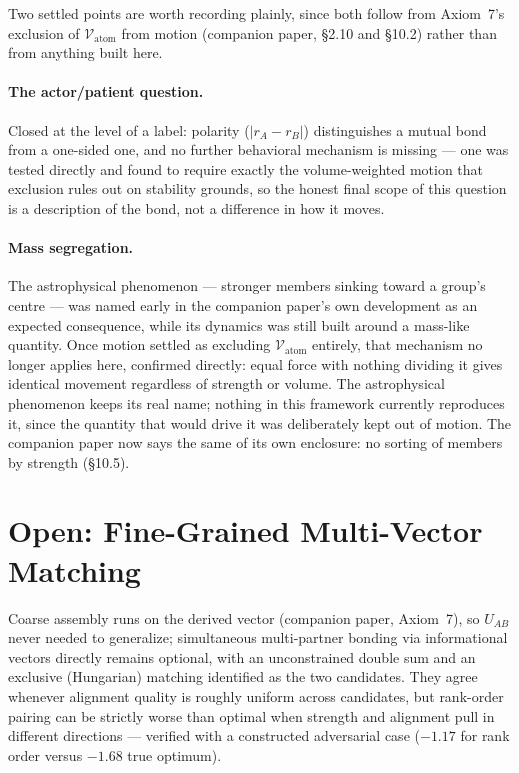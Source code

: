 \documentclass[12pt, a4paper]{article}
\begin{document}
Two settled points are worth recording plainly, since both follow
from Axiom~7's exclusion of $\mathcal{V}_{\text{atom}}$ from motion (companion paper, \S2.10 and \S10.2) rather than from anything built
here.

\paragraph{The actor/patient question.} Closed at the level of a
label: polarity ($\lvert r_A-r_B\rvert$) distinguishes a mutual bond
from a one-sided one, and no further behavioral mechanism is
missing --- one was tested directly and found to require exactly
the volume-weighted motion that exclusion rules out on stability
grounds, so the honest final scope of this question is a
description of the bond, not a difference in how it moves.

\paragraph{Mass segregation.} The astrophysical phenomenon ---
stronger members sinking toward a group's centre --- was named
early in the companion paper's own development as an expected
consequence, while its dynamics was still built around a mass-like
quantity. Once motion settled as excluding $\mathcal{V}_{\text{atom}}$
entirely, that mechanism no longer applies here, confirmed directly:
equal force with nothing dividing it gives identical movement
regardless of strength or volume. The astrophysical phenomenon keeps
its real name; nothing in this framework currently reproduces it,
since the quantity that would drive it was deliberately kept out of motion. The companion paper
now says the same of its own enclosure: no sorting of members by strength (\S10.5).

\section{Open: Fine-Grained Multi-Vector Matching}
\label{sec:open_matching}

Coarse assembly runs on the derived vector (companion paper,
Axiom~7), so $U_{AB}$ never needed to generalize; simultaneous
multi-partner bonding via informational vectors directly remains
optional, with an unconstrained double sum and an exclusive
(Hungarian) matching identified as the two candidates. They agree
whenever alignment quality is roughly uniform across candidates, but
rank-order pairing can be strictly worse than optimal when strength
and alignment pull in different directions --- verified with a
constructed adversarial case ($-1.17$ for rank order versus $-1.68$
true optimum).
\end{document}

